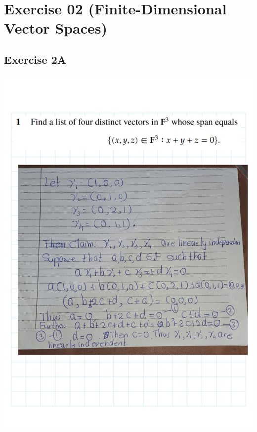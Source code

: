 \documentclass[
]{book}
\theoremstyle{definition}
\theoremstyle{definition}
\theoremstyle{definition}
\theoremstyle{definition}
\theoremstyle{remark}
\begin{document}
\chapter{Exercise 02 (Finite-Dimensional Vector Spaces)}\label{exercise-02-finite-dimensional-vector-spaces}

\section{Exercise 2A}\label{exercise-2a}

\includegraphics{fig/Ex2A/Ex2A-01.png}
\end{document}
